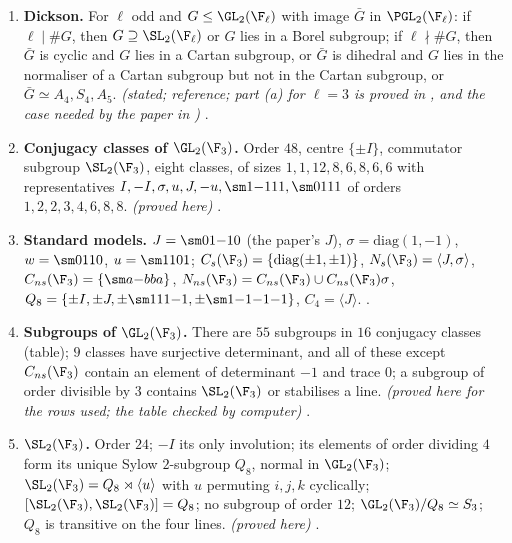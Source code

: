 \begin{enumerate}[label=\textbf{\thechapter.\arabic*}]
$N_{ns}\setminus C_{ns}$ have trace $0$, with $(c\sigma)^2=\det(c)I$; $\det(C_{ns})=\F_q^\times$; the determinant-one subgroups have orders
$q-1$, $2(q-1)$, $q+1$, $2(q+1)$; orbits on $\PP^1(\F_q)$: $C_s$: $1,1,q-1$; $N_s$: $2,q-1$; $\mathrm B$: $1,q$; $C_{ns}$ and $N_{ns}$ transitive.
\emph{(proved here)} .
\item \textbf{Dickson.} For $\ell$ odd and $G\le\GL_2(\F_\ell)$ with image $\bar G$ in $\PGL_2(\F_\ell)$: if $\ell\mid\#G$, then $G\supseteq\SL_2(\F_\ell)$ or $G$ lies in a Borel
subgroup; if $\ell\nmid\#G$, then $\bar G$ is cyclic and $G$ lies in a Cartan subgroup, or $\bar G$ is dihedral and $G$ lies in the normaliser
of a Cartan subgroup but not in the Cartan subgroup, or $\bar G\simeq A_4,S_4,A_5$. \emph{(stated; reference; part (a) for $\ell=3$ is
proved in , and the case needed by the paper in )} .
\item \textbf{Conjugacy classes of $\GL_2(\F_3)$.} Order $48$, centre $\{\pm I\}$, commutator subgroup $\SL_2(\F_3)$, eight classes, of sizes
$1,1,12,8,6,8,6,6$ with representatives $I,-I,\sigma,u,J,-u,\sm1{-1}11,\sm0111$ of orders $1,2,2,3,4,6,8,8$. \emph{(proved here)}
.
\item \textbf{Standard models.} $J=\sm01{-1}0$ (the paper's $J$), $\sigma=\mathrm{diag}(1,-1)$, $w=\sm0110$, $u=\sm1101$; $C_s(\F_3)=\{\mathrm{diag}(\pm1,\pm1)\}$,
$N_s(\F_3)=\langle J,\sigma\rangle$, $C_{ns}(\F_3)=\{\sm a{-b}ba\}$, $N_{ns}(\F_3)=C_{ns}(\F_3)\cup C_{ns}(\F_3)\sigma$, $Q_8=\{\pm I,\pm J,\pm\sm111{-1},\pm\sm1{-1}{-1}{-1}\}$,
$C_4=\langle J\rangle$. .
\item \textbf{Subgroups of $\GL_2(\F_3)$.} There are $55$ subgroups in $16$ conjugacy classes (table); $9$ classes have surjective
determinant, and all of these except $C_{ns}(\F_3)$ contain an element of determinant $-1$ and trace $0$; a subgroup of order divisible
by $3$ contains $\SL_2(\F_3)$ or stabilises a line. \emph{(proved here for the rows used; the table checked by computer)}
.
\item \textbf{$\SL_2(\F_3)$.} Order $24$; $-I$ its only involution; its elements of order dividing $4$ form its unique Sylow $2$-subgroup
$Q_8$, normal in $\GL_2(\F_3)$; $\SL_2(\F_3)=Q_8\rtimes\langle u\rangle$ with $u$ permuting $i,j,k$ cyclically; $[\SL_2(\F_3),\SL_2(\F_3)]=Q_8$; no
subgroup of order $12$; $\GL_2(\F_3)/Q_8\simeq S_3$; $Q_8$ is transitive on the four lines. \emph{(proved here)} .

\end{enumerate}

